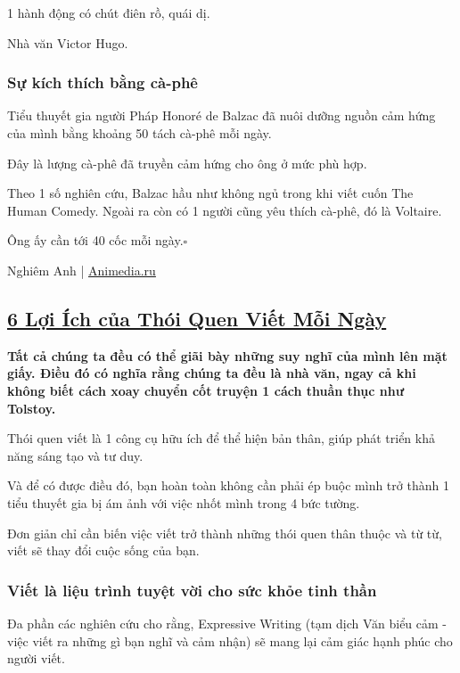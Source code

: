 \documentclass{article}
\begin{document}
1 hành động có chút điên rồ, quái dị.

\textsf{Nhà văn Victor Hugo.}

\subsubsection{Sự kích thích bằng cà-phê}
Tiểu thuyết gia người Pháp Honoré de Balzac đã nuôi dưỡng nguồn cảm hứng của mình bằng khoảng 50 tách cà-phê mỗi ngày.

Đây là lượng cà-phê đã truyền cảm hứng cho ông ở mức phù hợp.

Theo 1 số nghiên cứu, Balzac hầu như không ngủ trong khi viết cuốn The Human Comedy. Ngoài ra còn có 1 người cũng yêu thích cà-phê, đó là Voltaire.

Ông ấy cần tới 40 cốc mỗi ngày.\hfill$\square$

\begin{flushright}
	Nghiêm Anh | \url{Animedia.ru}
\end{flushright}


\subsection{\href{http://tramdoc.vn/tin-tuc/6-loi-ich-cua-thoi-quen-viet-moi-ngay-nzG1AW.html}{6 Lợi Ích của Thói Quen Viết Mỗi Ngày}}

\textbf{Tất cả chúng ta đều có thể giãi bày những suy nghĩ của mình lên mặt giấy. Điều đó có nghĩa rằng chúng ta đều là nhà văn, ngay cả khi không biết cách xoay chuyển cốt truyện 1 cách thuần thục như Tolstoy.}

%
Thói quen viết là 1 công cụ hữu ích để thể hiện bản thân, giúp phát triển khả năng sáng tạo và tư duy.

Và để có được điều đó, bạn hoàn toàn không cần phải ép buộc mình trở thành 1 tiểu thuyết gia bị ám ảnh với việc nhốt mình trong 4 bức tường.

Đơn giản chỉ cần biến việc viết trở thành những thói quen thân thuộc và từ từ, viết sẽ thay đổi cuộc sống của bạn.

\subsubsection{Viết là liệu trình tuyệt vời cho sức khỏe tinh thần}
Đa phần các nghiên cứu cho rằng, Expressive Writing (tạm dịch Văn biểu cảm - việc viết ra những gì bạn nghĩ và cảm nhận) sẽ mang lại cảm giác hạnh phúc cho người viết.
\end{document}
